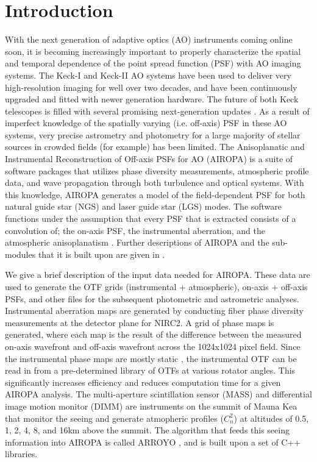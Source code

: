 \documentclass[]{spie}  %
\begin{document}
\section{Introduction} \label{sec:intro}
With the next generation of adaptive optics (AO) instruments coming online soon, it is becoming increasingly important to properly characterize the spatial and temporal dependence of the point spread function (PSF) with AO imaging systems. The Keck-I and Keck-II AO systems have been used to deliver very high-resolution imaging for well over two decades, and have been continuously upgraded and fitted with newer generation hardware. The future of both Keck telescopes is filled with several promising next-generation updates \citep{wizinowich:2020a, bond:2020a}. 
As a result of imperfect knowledge of the spatially varying (i.e. off-axis) PSF in these AO systems, very precise astrometry and photometry for a large majority of stellar sources in crowded fields (for example) has been limited. The Anisoplanatic and Instrumental Reconstruction of Off-axis PSFs for AO (AIROPA) is a suite of software packages that utilizes phase diversity measurements, atmospheric profile data, and wave propagation through both turbulence and optical systems. With this knowledge, AIROPA generates a model of the field-dependent PSF for both natural guide star (NGS) and laser guide star (LGS) modes. The software functions under the assumption that every PSF that is extracted consists of a convolution of; the on-axis PSF, the instrumental aberration, and the atmospheric anisoplanatism \cite{do:2018a}. Further descriptions of AIROPA and the sub-modules that it is built upon are given in \cite{witzel:2016a}.

\indent We give a brief description of the input data needed for AIROPA. These data are used to generate the OTF grids (instrumental + atmospheric), on-axis + off-axis PSFs, and other files for the subsequent photometric and astrometric analyses. Instrumental aberration maps are generated by conducting fiber phase diversity measurements at the detector plane for NIRC2. A grid of phase maps is generated, where each map is the result of the difference between the measured on-axis wavefront and off-axis wavefront across the 1024x1024 pixel field. Since the instrumental phase maps are mostly static \citep{Ciurlo:inprep}, the instrumental OTF can be read in from a pre-determined library of OTFs at various rotator angles. This significantly increases efficiency and reduces computation time for a given AIROPA analysis. The multi-aperture scintillation sensor (MASS) and differential image motion monitor (DIMM) are instruments on the summit of Mauna Kea that monitor the seeing and generate atmopheric profiles ($C_n^{2}$) at altitudes of 0.5, 1, 2, 4, 8, and 16km above the summit. The algorithm that feeds this seeing information into AIROPA is called ARROYO \citep{britton:2006a}, and is built upon a set of C++ libraries. 
\end{document}
